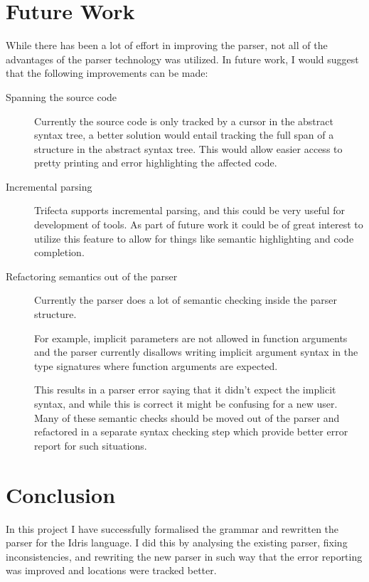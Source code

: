 \documentclass[a4paper]{article}%
\begin{document}
\section{Future Work}
\label{sec:FutureWork}
While there has been a lot of effort in improving the parser, not all of the advantages of the parser technology was utilized.
In future work, I would suggest that the following improvements can be made:

\begin{description}
  \item[Spanning the source code] Currently the source code is only tracked by a cursor in the abstract syntax tree,
        a better solution would entail tracking the full span of a structure in the abstract syntax tree. This would allow easier access to pretty printing and error highlighting the affected code.
  \item[Incremental parsing] Trifecta supports incremental parsing, and this could be very useful for development of tools. As part of future work
                                       it could be of great interest to utilize this feature to allow for things like semantic highlighting and code completion.
  \item[Refactoring semantics out of the parser] Currently the parser does a lot of semantic checking inside the parser structure.

                                                 For example, implicit parameters are not allowed in function arguments
                                                 and the parser currently disallows writing implicit argument syntax in the type signatures where function arguments
                                                 are expected.

                                                 This results in a parser error saying that it didn't expect the implicit syntax, and while this is correct
                                                 it might be confusing for a new user. Many of these semantic checks should be moved out of the parser and
                                                 refactored in a separate syntax checking step which provide better error report for such situations.
\end{description}

\section{Conclusion}
\label{sec:Conclusion}
In this project I have successfully formalised the grammar and rewritten the parser for the Idris language.
I did this by analysing the existing parser, fixing inconsistencies, and rewriting the new parser in such way that the error reporting was improved and locations were tracked better.
\end{document}
